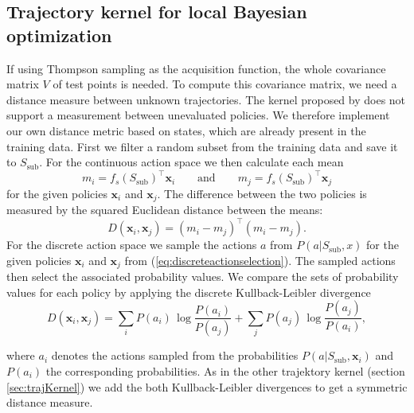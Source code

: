 \subsection{Trajectory kernel for local Bayesian optimization}
\label{sec:ownTK}
If using Thompson sampling as the acquisition function, the whole covariance matrix $V$ of test points is needed. To compute this covariance matrix, we need a distance measure between unknown trajectories. The kernel proposed by \cite{wilson2014using} does not support a measurement between unevaluated policies. We therefore implement our own distance metric based on states, which are already present in the training data. First we filter a random subset from the training data and save it to $S_{\text{sub}}$. For the continuous action space we then calculate each mean
$$m_i = f_s(S_{\text{sub}})^\top \mathbf{x}_i \qquad \text{and}\qquad m_j = f_s(S_{\text{sub}})^\top \mathbf{x}_j$$
for the given policies $\mathbf{x}_i$ and $\mathbf{x}_j$. The difference between the two policies is measured by the squared Euclidean distance between the means:
$$D(\mathbf{x}_i,\mathbf{x}_j) = (m_i - m_j)^\top (m_i - m_j).$$
For the discrete action space we sample the actions $a$ from $P(a|S_{\text{sub}},x)$ for the given policies $\mathbf{x}_i$ and $\mathbf{x}_j$ from (\ref{eq:discreteactionselection}). The sampled actions then select the associated probability values. We compare the sets of probability values for each policy by applying the discrete Kullback-Leibler divergence
$$D(\mathbf{x}_i,\mathbf{x}_j) = \sum _{i}P(a_i)\,\log {\frac {P(a_i)}{P(a_j)}} + \sum _{j}P(a_j)\,\log {\frac {P(a_j)}{P(a_i)}},$$

where $a_i$ denotes the actions sampled from the probabilities $P(a|S_{\text{sub}},\mathbf{x}_i)$ and $P(a_i)$ the corresponding probabilities. As in the other trajektory kernel (section \ref{sec:trajKernel}) we add the both Kullback-Leibler divergences to get a symmetric distance measure.

%

